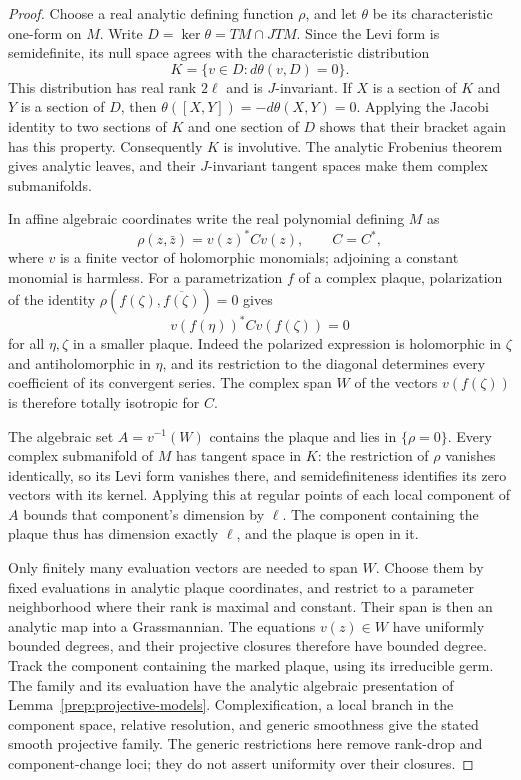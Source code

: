 \begin{proof}
Choose a real analytic defining function $\rho$, and let $\theta$ be its
characteristic one-form on $M$.  Write $D=\ker\theta=TM\cap JTM$.
Since the Levi form is semidefinite, its null space agrees with the
characteristic distribution
\[
 K=\{v\in D:d\theta(v,D)=0\}.
\]
This distribution has real rank $2\ell$ and is $J$-invariant.  If $X$ is a
section of $K$ and $Y$ is a section of $D$, then
$\theta([X,Y])=-d\theta(X,Y)=0$.  Applying the Jacobi identity to two
sections of $K$ and one section of $D$ shows that their bracket again has
this property.  Consequently $K$ is involutive.  The analytic Frobenius
theorem gives analytic leaves, and their $J$-invariant tangent spaces make
them complex submanifolds.

In affine algebraic coordinates write the real polynomial defining $M$ as
\[
             \rho(z,\bar z)=v(z)^*C v(z),\qquad C=C^*,
\]
where $v$ is a finite vector of holomorphic monomials; adjoining a constant
monomial is harmless.  For a parametrization $f$ of a complex plaque,
polarization of the identity $\rho(f(\zeta),\overline{f(\zeta)})=0$ gives
\[
             v(f(\eta))^*C v(f(\zeta))=0
\]
for all $\eta,\zeta$ in a smaller plaque.  Indeed the polarized expression
is holomorphic in $\zeta$ and antiholomorphic in $\eta$, and its restriction
to the diagonal determines every coefficient of its convergent series.
The complex span $W$ of the vectors $v(f(\zeta))$ is therefore totally
isotropic for $C$.

The algebraic set $A=v^{-1}(W)$ contains the plaque and lies in
$\{\rho=0\}$.  Every complex submanifold of $M$ has tangent space in $K$:
the restriction of $\rho$ vanishes identically, so its Levi form vanishes
there, and semidefiniteness identifies its zero vectors with its kernel.
Applying this at regular points of each local component of $A$ bounds
that component's dimension by $\ell$.  The component containing the
plaque thus has dimension exactly $\ell$, and the plaque is open in it.

Only finitely many evaluation vectors are needed to span $W$.  Choose
them by fixed evaluations in analytic plaque coordinates, and restrict
to a parameter neighborhood where their rank is maximal and constant.
Their span is then an analytic map into a Grassmannian.  The equations
$v(z)\in W$ have uniformly bounded degrees, and their projective closures
therefore have bounded degree.  Track the component containing the marked
plaque, using its irreducible germ.  The family and its evaluation have
the analytic algebraic presentation of Lemma~\ref{prep:projective-models}.
Complexification, a local branch in the component space,
relative resolution, and generic smoothness give the stated smooth
projective family.  The generic restrictions here remove rank-drop and
component-change loci; they do not assert uniformity over their closures.
\end{proof}

